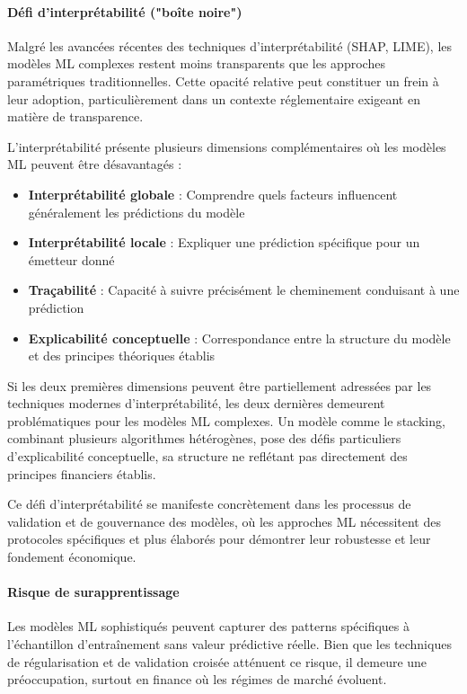 \paragraph{Défi d'interprétabilité ("boîte noire")}

Malgré les avancées récentes des techniques d'interprétabilité (SHAP, LIME), les modèles ML complexes restent moins transparents que les approches paramétriques traditionnelles. Cette opacité relative peut constituer un frein à leur adoption, particulièrement dans un contexte réglementaire exigeant en matière de transparence.

L'interprétabilité présente plusieurs dimensions complémentaires où les modèles ML peuvent être désavantagés :
\begin{itemize}
    \item \textbf{Interprétabilité globale} : Comprendre quels facteurs influencent généralement les prédictions du modèle
    \item \textbf{Interprétabilité locale} : Expliquer une prédiction spécifique pour un émetteur donné
    \item \textbf{Traçabilité} : Capacité à suivre précisément le cheminement conduisant à une prédiction
    \item \textbf{Explicabilité conceptuelle} : Correspondance entre la structure du modèle et des principes théoriques établis
\end{itemize}

Si les deux premières dimensions peuvent être partiellement adressées par les techniques modernes d'interprétabilité, les deux dernières demeurent problématiques pour les modèles ML complexes. Un modèle comme le stacking, combinant plusieurs algorithmes hétérogènes, pose des défis particuliers d'explicabilité conceptuelle, sa structure ne reflétant pas directement des principes financiers établis.

Ce défi d'interprétabilité se manifeste concrètement dans les processus de validation et de gouvernance des modèles, où les approches ML nécessitent des protocoles spécifiques et plus élaborés pour démontrer leur robustesse et leur fondement économique.

\paragraph{Risque de surapprentissage}

Les modèles ML sophistiqués peuvent capturer des patterns spécifiques à l'échantillon d'entraînement sans valeur prédictive réelle. Bien que les techniques de régularisation et de validation croisée atténuent ce risque, il demeure une préoccupation, surtout en finance où les régimes de marché évoluent.

